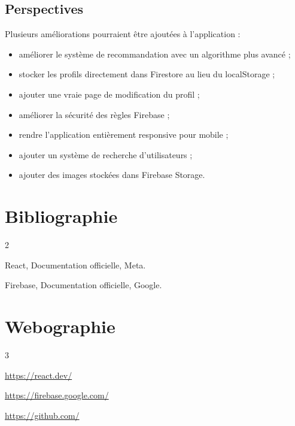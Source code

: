 \documentclass[a4paper, 12pt, twoside]{article}
\begin{document}
\subsection{Perspectives}

Plusieurs améliorations pourraient être ajoutées à l'application :

\begin{itemize}
    \item améliorer le système de recommandation avec un algorithme plus avancé ;
    \item stocker les profils directement dans Firestore au lieu du localStorage ;
    \item ajouter une vraie page de modification du profil ;
    \item améliorer la sécurité des règles Firebase ;
    \item rendre l'application entièrement responsive pour mobile ;
    \item ajouter un système de recherche d'utilisateurs ;
    \item ajouter des images stockées dans Firebase Storage.
\end{itemize}

\newpage

\section{Bibliographie}

\renewcommand{\bibname}{}
\renewcommand{\refname}{}

\begin{thebibliography}{2}

React, Documentation officielle, Meta.

Firebase, Documentation officielle, Google.

\end{thebibliography}

\newpage

\section{Webographie}

\begin{thebibliography}{3}

\url{https://react.dev/}

\url{https://firebase.google.com/}

\url{https://github.com/}

\end{thebibliography}
\end{document}
